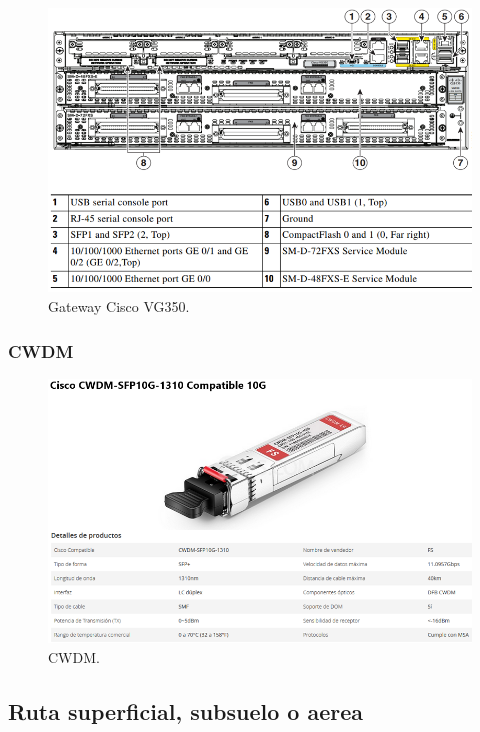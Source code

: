 \documentclass[12pt,letterpaper]{article}
\begin{document}
\begin{figure}[ht]
    \centering
    \includegraphics[width=.8\textwidth]{imagenes/gatequipo.PNG}
    \caption{Gateway Cisco VG350.}
\end{figure}

\subsubsection{CWDM}
\begin{figure}[ht]
    \centering
    \includegraphics[width=1\textwidth]{imagenes/cwdm.PNG}
    \caption{CWDM.}
\end{figure}

\subsection{Ruta superficial, subsuelo o aerea}

\newpage
\end{document}
